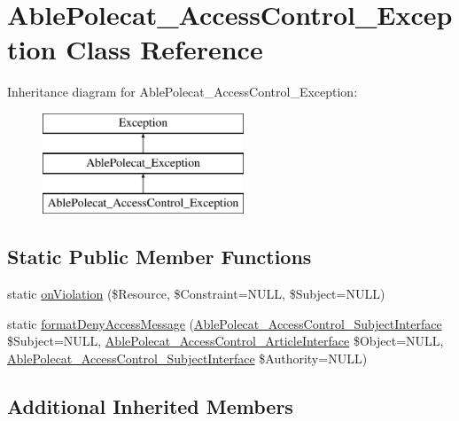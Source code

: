 \hypertarget{class_able_polecat___access_control___exception}{}\section{Able\+Polecat\+\_\+\+Access\+Control\+\_\+\+Exception Class Reference}
\label{class_able_polecat___access_control___exception}
Inheritance diagram for Able\+Polecat\+\_\+\+Access\+Control\+\_\+\+Exception\+:\begin{figure}[H]
\begin{center}
\leavevmode
\includegraphics[height=3.000000cm]{class_able_polecat___access_control___exception}
\end{center}
\end{figure}
\subsection*{Static Public Member Functions}
\begin{DoxyCompactItemize}
\item 
static \hyperlink{class_able_polecat___access_control___exception_afe9c26ecd42f5dbb6deaa4ab9c7483b5}{on\+Violation} (\$Resource, \$Constraint=N\+U\+L\+L, \$Subject=N\+U\+L\+L)
\item 
static \hyperlink{class_able_polecat___access_control___exception_a35289e9f228b7d101bc6e287224202c7}{format\+Deny\+Access\+Message} (\hyperlink{interface_able_polecat___access_control___subject_interface}{Able\+Polecat\+\_\+\+Access\+Control\+\_\+\+Subject\+Interface} \$Subject=N\+U\+L\+L, \hyperlink{interface_able_polecat___access_control___article_interface}{Able\+Polecat\+\_\+\+Access\+Control\+\_\+\+Article\+Interface} \$Object=N\+U\+L\+L, \hyperlink{interface_able_polecat___access_control___subject_interface}{Able\+Polecat\+\_\+\+Access\+Control\+\_\+\+Subject\+Interface} \$Authority=N\+U\+L\+L)
\end{DoxyCompactItemize}
\subsection*{Additional Inherited Members}



